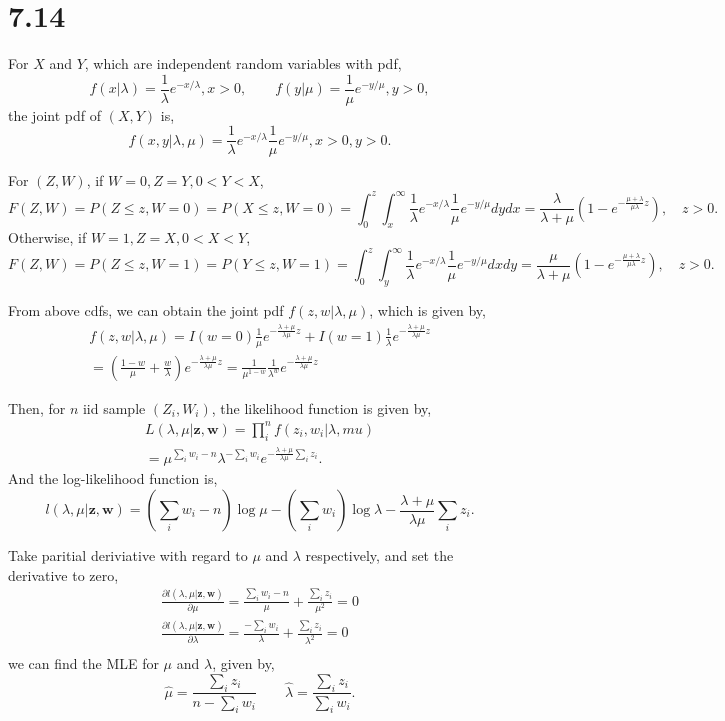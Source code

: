 \documentclass[letterpaper]{article}
\begin{document}
    \section*{7.14}
    For $X$ and $Y$, which are independent random variables with pdf,
    \[
    f(x|\lambda) = \frac{1}{\lambda} e^{-x/\lambda}, x > 0, \qquad f(y|\mu) = \frac{1}{\mu} e^{-y/\mu}, y > 0,
    \]
    the joint pdf of $(X, Y)$ is,
    \[
    f(x, y|\lambda, \mu) = \frac{1}{\lambda} e^{-x/\lambda}\frac{1}{\mu} e^{-y/\mu}, x > 0, y > 0.
    \]

    For $(Z, W)$, if $W = 0, Z = Y, 0 < Y < X$,
    \[
    F(Z, W) = P(Z \le z, W = 0) = P(X \le z, W=0) = \int_0^z \int_x^\infty \frac{1}{\lambda} e^{-x/\lambda}\frac{1}{\mu} e^{-y/\mu} dy dx = \frac{\lambda}{\lambda + \mu} (1-e^{-\frac{\mu+\lambda}{\mu\lambda} z}), \quad z > 0.
    \]
    Otherwise, if $W = 1, Z = X, 0 < X < Y$,
    \[
    F(Z, W) = P(Z \le z, W = 1) = P(Y \le z, W=1) = \int_0^z \int_y^\infty \frac{1}{\lambda} e^{-x/\lambda}\frac{1}{\mu} e^{-y/\mu} dx dy = \frac{\mu}{\lambda + \mu} (1-e^{-\frac{\mu+\lambda}{\mu\lambda} z}), \quad z > 0.
    \]

    From above cdfs, we can obtain the joint pdf $f(z, w|\lambda, \mu)$, which is given by,
    \begin{eqnarray*}
    f(z, w|\lambda, \mu) = I(w = 0) \frac{1}{\mu} e^{-\frac{\lambda+\mu}{\lambda \mu} z} + I(w = 1)\frac{1}{\lambda} e^{-\frac{\lambda+\mu}{\lambda \mu} z} \\
    = \left(\frac{1-w}{\mu} + \frac{w}{\lambda}\right) e^{-\frac{\lambda+\mu}{\lambda \mu} z} = \frac{1}{\mu^{1-w}} \frac{1}{\lambda^w} e^{-\frac{\lambda+\mu}{\lambda \mu} z} 
    \end{eqnarray*}

    Then, for $n$ iid sample $(Z_i, W_i)$, the likelihood function is given by,
    \begin{eqnarray*}
    L(\lambda, \mu|\mathbf{z, w}) = \prod_{i}^n f(z_i, w_i|\lambda, mu) \\
    = \mu^{\sum_i w_i-n} \lambda^{-\sum_i w_i} e^{-\frac{\lambda + \mu}{\lambda \mu} \sum_i z_i}.
    \end{eqnarray*}
    And the log-likelihood function is,
    \[
    l(\lambda, \mu|\mathbf{z, w}) = \left(\sum_i w_i - n\right) \log \mu - \left(\sum_i w_i\right) \log \lambda - \frac{\lambda + \mu}{\lambda \mu} \sum_i z_i.
    \]

    Take paritial deriviative with regard to $\mu$ and $\lambda$ respectively, and set the derivative to zero, 
    \begin{eqnarray*}
        \frac{\partial l(\lambda, \mu|\mathbf{z, w})}{\partial \mu} = \frac{\sum_i w_i - n}{\mu} + \frac{\sum_i z_i}{\mu^2} = 0 \\
        \frac{\partial l(\lambda, \mu|\mathbf{z, w})}{\partial \lambda} = \frac{-\sum_i w_i}{\lambda} + \frac{\sum_i z_i}{\lambda^2} = 0 \\
    \end{eqnarray*}
    we can find the MLE for $\mu$ and $\lambda$, given by,
    \[
    \hat \mu = \frac{\sum_i z_i}{n - \sum_i w_i} \qquad
    \hat \lambda = \frac{\sum_i z_i}{\sum_i w_i}.
    \]
\end{document}
